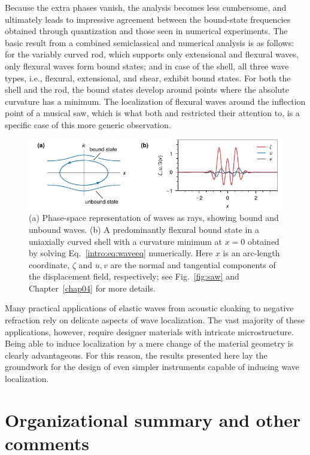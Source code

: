 Because the extra phases vanish, the analysis becomes less cumbersome, and ultimately leads to impressive agreement between the bound-state frequencies obtained through quantization and those seen in numerical experiments.
The basic result from a combined semiclassical and numerical analysis is as follows: for the variably curved rod, which supports only extensional and flexural waves, only flexural waves form bound states; and in case of the shell, all three wave types, i.e., flexural, extensional, and shear, exhibit bound states.
For both the shell and the rod, the bound states develop around points where the absolute curvature has a minimum.
The localization of flexural waves around the inflection point of a musical saw, which is what both \citet{scott1992} and \citet{shankar2022} restricted their attention to, is a specific case of this more generic observation.
%
\begin{figure}
  \begin{center}
    \includegraphics{figures/intro/phasespace.pdf}
  \end{center}
  \caption{(a) Phase-space representation of waves as rays, showing bound and unbound waves. (b) A predominantly flexural bound state in a uniaxially curved shell with a curvature minimum at $x = 0$ obtained by solving Eq.~\eqref{intro:eq:waveeq} numerically.
  Here $x$ is an arc-length coordinate, $\zeta$ and $u, v$ are the normal and tangential components of the displacement field, respectively; see Fig.~\ref{fig:saw} and Chapter~\ref{chap04} for more details.}
  \label{fig:phasespace}
\end{figure}
%
Many practical applications of elastic waves from acoustic cloaking to negative refraction rely on delicate aspects of wave localization.
The vast majority of these applications, however, require designer materials with intricate microstructure.
Being able to induce localization by a mere change of the material geometry is clearly advantageous.
For this reason, the results presented here lay the groundwork for the design of even simpler instruments capable of inducing wave localization.

\section{Organizational summary and other comments}

